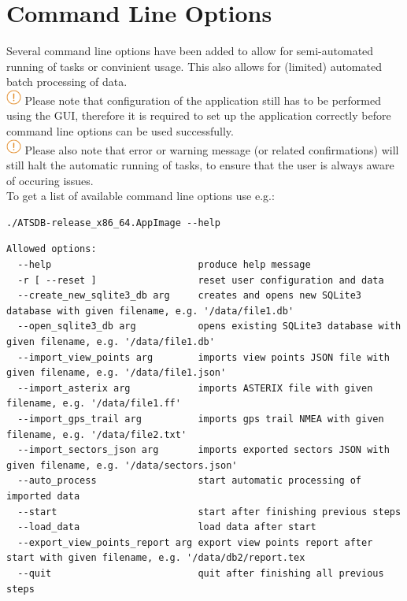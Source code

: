 \chapter{Command Line Options}
\label{sec:command_line} 

Several command line options have been added to allow for semi-automated running of tasks or convinient usage. This also allows for (limited) automated batch processing of data. \\

\includegraphics[width=0.5cm]{../../data/icons/hint.png} Please note that configuration of the application still has to be performed using the GUI, therefore it is required to set up the application correctly before command line options can be used successfully.\\

\includegraphics[width=0.5cm]{../../data/icons/hint.png} Please also note that error or warning message (or related confirmations) will still halt the automatic running of tasks, to ensure that the user is always aware of occuring issues. \\

To get a list of available command line options use e.g.:
\begin{lstlisting}
./ATSDB-release_x86_64.AppImage --help
\end{lstlisting}


\begin{lstlisting}
Allowed options:
  --help                          produce help message
  -r [ --reset ]                  reset user configuration and data
  --create_new_sqlite3_db arg     creates and opens new SQLite3 database with given filename, e.g. '/data/file1.db'
  --open_sqlite3_db arg           opens existing SQLite3 database with given filename, e.g. '/data/file1.db'
  --import_view_points arg        imports view points JSON file with given filename, e.g. '/data/file1.json'
  --import_asterix arg            imports ASTERIX file with given filename, e.g. '/data/file1.ff'
  --import_gps_trail arg          imports gps trail NMEA with given filename, e.g. '/data/file2.txt'
  --import_sectors_json arg       imports exported sectors JSON with given filename, e.g. '/data/sectors.json'
  --auto_process                  start automatic processing of imported data
  --start                         start after finishing previous steps
  --load_data                     load data after start
  --export_view_points_report arg export view points report after start with given filename, e.g. '/data/db2/report.tex
  --quit                          quit after finishing all previous steps

\end{lstlisting}
\ \\

